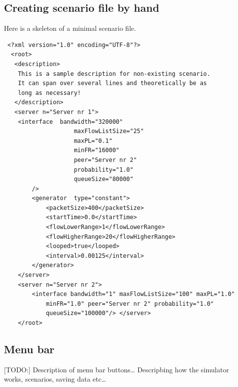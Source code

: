 \documentclass[a4paper,12pt]{article}
\begin{document}
    \subsection{Creating scenario file by hand}
    
    Here is a skeleton of a minimal scenario file.
    \begin{verbatim}
 <?xml version="1.0" encoding="UTF-8"?>
  <root>
   <description>
    This is a sample description for non-existing scenario.
    It can span over several lines and theoretically be as
    long as necessary!
   </description>
   <server n="Server nr 1">
    <interface	bandwidth="320000"
        			maxFlowListSize="25"
            		maxPL="0.1"
            		minFR="16000"
            		peer="Server nr 2"
            		probability="1.0"
            		queueSize="80000"
		/>
        <generator	type="constant">
            <packetSize>400</packetSize>
            <startTime>0.0</startTime>
            <flowLowerRange>1</flowLowerRange>
            <flowHigherRange>20</flowHigherRange>
            <looped>true</looped>
            <interval>0.00125</interval>
        </generator>
    </server>
    <server n="Server nr 2">
        <interface bandwidth="1" maxFlowListSize="100" maxPL="1.0"
            minFR="1.0" peer="Server nr 2" probability="1.0"
            queueSize="100000"/> </server>
	</root> 
	\end{verbatim}

	\subsection{Menu bar}
	
	[TODO:]
	Description of menu bar buttons\ldots
	Descripbing how the simulator works, scenarios,	saving data etc\ldots




	\newpage
\end{document}
